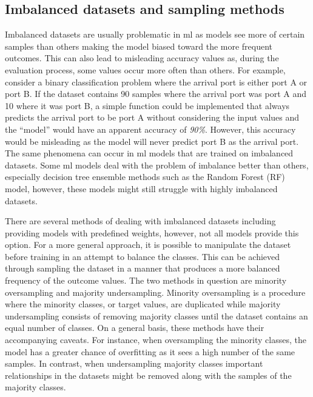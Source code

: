\subsection{Imbalanced datasets and sampling methods}

Imbalanced datasets are usually problematic in \acrshort{ml} as models see more of certain samples than others making the model biased toward the more frequent outcomes. This can also lead to misleading accuracy values as, during the evaluation process, some values occur more often than others. For example, consider a binary classification problem where the arrival port is either port A or port B. If the dataset contains 90 samples where the arrival port was port A and 10 where it was port B, a simple function could be implemented that always predicts the arrival port to be port A without considering the input values and the ``model'' would have an apparent accuracy of \textit{90\%}. However, this accuracy would be misleading as the model will never predict port B as the arrival port. The same phenomena can occur in \acrshort{ml} models that are trained on imbalanced datasets. Some \acrshort{ml} models deal with the problem of imbalance better than others, especially decision tree ensemble methods such as the Random Forest (RF) model, however, these models might still struggle with highly imbalanced datasets.

There are several methods of dealing with imbalanced datasets including providing models with predefined weights, however, not all models provide this option. For a more general approach, it is possible to manipulate the dataset before training in an attempt to balance the classes. This can be achieved through sampling the dataset in a manner that produces a more balanced frequency of the outcome values. The two methods in question are minority oversampling and majority undersampling. Minority oversampling is a procedure where the minority classes, or target values, are duplicated while majority undersampling consists of removing majority classes until the dataset contains an equal number of classes. On a general basis, these methods have their accompanying caveats. For instance, when oversampling the minority classes, the model has a greater chance of overfitting as it sees a high number of the same samples. In contrast, when undersampling majority classes important relationships in the datasets might be removed along with the samples of the majority classes.

